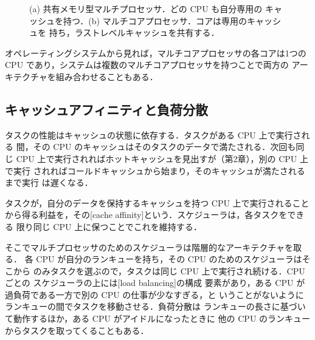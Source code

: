 \documentclass[../main.tex]{subfiles}
\begin{document}
\begin{figure}[htbp]
  \centering
  
  \caption{(a) 共有メモリ型マルチプロセッサ．どの CPU も自分専用の
    キャッシュを持つ．(b) マルチコアプロセッサ．コアは専用のキャッシュを
    持ち，ラストレベルキャッシュを共有する．}
  \label{fig:l07-multicpu}
\end{figure}

オペレーティングシステムから見れば，マルチコアプロセッサの各コアは1つの
CPU であり，システムは複数のマルチコアプロセッサを持つことで両方の
アーキテクチャを組み合わせることもある．

\subsection{キャッシュアフィニティと負荷分散}

タスクの性能はキャッシュの状態に依存する．タスクがある CPU 上で実行される
間，その CPU のキャッシュはそのタスクのデータで満たされる．次回も同じ CPU
上で実行されればホットキャッシュを見出すが（第2章），別の CPU 上で実行
されればコールドキャッシュから始まり，そのキャッシュが満たされるまで実行
は遅くなる．

\begin{definition}[キャッシュアフィニティ]
  タスクが，自分のデータを保持するキャッシュを持つ CPU 上で実行されること
  から得る利益を，その[cache affinity]という．スケジューラは，各タスクをできる
  限り同じ CPU 上に保つことでこれを維持する．
\end{definition}

そこでマルチプロセッサのためのスケジューラは階層的なアーキテクチャを取る．
各 CPU が自分のランキューを持ち，その CPU のためのスケジューラはそこから
のみタスクを選ぶので，タスクは同じ CPU 上で実行され続ける．CPU ごとの
スケジューラの上には[load balancing]の構成
要素があり，ある CPU が過負荷である一方で別の CPU の仕事が少なすぎる，と
いうことがないようにランキューの間でタスクを移動させる．負荷分散は
ランキューの長さに基づいて動作するほか，ある CPU がアイドルになったときに
他の CPU のランキューからタスクを取ってくることもある．
\end{document}
